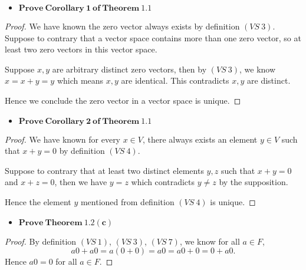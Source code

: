 \begin{Exercise}\label{ex:1.2.9}
\begin{itemize}
\item $\mathbf{Prove\ Corollary\ 1\ of\ Theorem\ 1.1}$ 
\end{itemize}
\begin{proof}
We have known the zero vector always exists by definition $(VS\ 3)$. Suppose to contrary that a vector space contains more than one zero vector, so at least two zero vectors in this vector space. 

Suppose $x,y$ are arbitrary distinct zero vectors, then by $(VS\ 3)$, we know $x = x+y =y$ which means $x,y$ are identical. This contradicts $x,y$ are distinct.

Hence we conclude the zero vector in a vector space is unique.
\end{proof}

\begin{itemize}
\item $\mathbf{Prove\ Corollary\ 2\ of\ Theorem\ 1.1}$ 
\end{itemize}
\begin{proof}
We have known for every $x\in V$, there always exists an element $y\in V$ such that $x+y=0$ by definition $(VS\ 4)$. 

Suppose to contrary that at least two distinct elements $y,z$ such that $x+y=0$ and $x+z=0$, then we have $y=z$ which contradicts $y\neq z$ by the supposition.

Hence the element $y$ mentioned from definition $(VS\ 4)$ is unique.
\end{proof}

\begin{itemize}
\item $\mathbf{Prove\ Theorem\ 1.2(c)}$ 
\end{itemize}
\begin{proof}
By definition $(VS\ 1)$, $(VS\ 3)$, $(VS\ 7)$, we know for all $a\in F$,
$$
a0 + a0 = a(0+0) = a0 = a0+0 = 0+a0.
$$
Hence $a0 = 0$ for all $a\in F$.
\end{proof}

\end{Exercise}